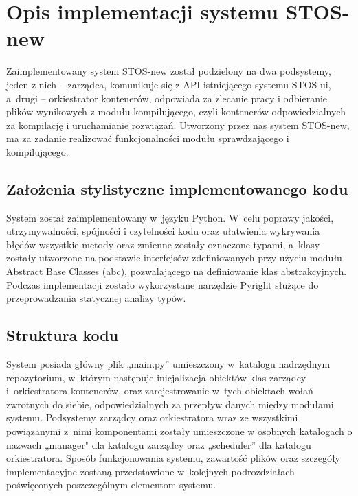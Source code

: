 \section{Opis implementacji systemu STOS-new}
Zaimplementowany system STOS-new został podzielony na dwa podsystemy, jeden z nich -- zarządca, komunikuje się z API istniejącego systemu STOS-ui, a~drugi -- orkiestrator kontenerów, odpowiada za zlecanie pracy i odbieranie plików wynikowych z modułu kompilującego, czyli kontenerów odpowiedzialnych za kompilację i uruchamianie rozwiązań. Utworzony przez nas system STOS-new, ma za zadanie realizować funkcjonalności modułu sprawdzającego i kompilującego.

\subsection{Założenia stylistyczne implementowanego kodu}
System został zaimplementowany w~języku Python. W~celu poprawy jakości, utrzymywalności, spójności i czytelności kodu oraz ułatwienia wykrywania błędów wszystkie metody oraz zmienne zostały oznaczone typami, a~klasy zostały utworzone na podstawie interfejsów zdefiniowanych przy użyciu modułu Abstract Base Classes (abc)\cite{pythonAbc}, pozwalającego na definiowanie klas abstrakcyjnych. Podczas implementacji zostało wykorzystane narzędzie Pyright służące do przeprowadzania statycznej analizy typów.

\subsection{Struktura kodu}
System posiada główny plik „main.py” umieszczony w~katalogu nadrzędnym repozytorium, w~którym następuje inicjalizacja obiektów klas zarządcy i~orkiestratora kontenerów, oraz zarejestrowanie w~tych obiektach wołań zwrotnych do siebie, odpowiedzialnych za przepływ danych między modułami systemu. Podsystemy zarządcy oraz orkiestratora wraz ze wszystkimi powiązanymi z~nimi komponentami zostały umieszczone w osobnych katalogach o nazwach „manager" dla katalogu zarządcy oraz „scheduler” dla katalogu orkiestratora.
Sposób funkcjonowania systemu, zawartość plików oraz szczegóły implementacyjne zostaną przedstawione w~kolejnych podrozdziałach poświęconych poszczególnym elementom systemu. 
